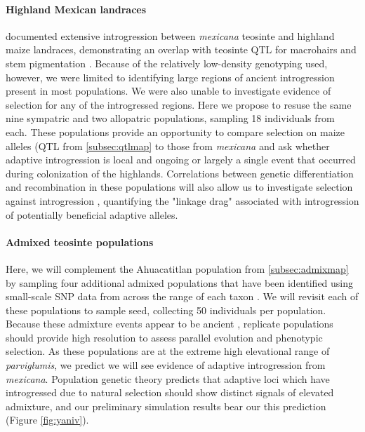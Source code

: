 \paragraph{Highland Mexican landraces}
\citet{Hufford2013} documented extensive introgression between \emph{mexicana} teosinte and highland maize landraces, demonstrating an overlap with teosinte QTL for macrohairs and stem pigmentation \citep{Lauter2004a}. Because of the relatively low-density genotyping used, however, we were limited to identifying large regions of ancient introgression present in most populations.  We were also unable to investigate evidence of selection for any of the introgressed regions.  Here we propose to resuse the same nine sympatric and two allopatric populations, sampling 18 individuals from each. These populations provide an opportunity to compare selection on maize alleles (QTL from \ref{subsec:qtlmap} to those from \emph{mexicana} and ask whether adaptive introgression is local and ongoing or largely a single event that occurred during colonization of the highlands. Correlations between genetic differentiation and recombination in these populations will also allow us to investigate selection against introgression \citep{Brandvain2013}, quantifying the "linkage drag" associated with introgression of potentially beneficial adaptive alleles.  

\paragraph{Admixed teosinte populations}
Here, we will complement the Ahuacatitlan population from \ref{subsec:admixmap} by sampling four additional admixed populations that have been identified using small-scale SNP data from across the range of each taxon \citep{vanheerwaarden2011a}.  We will revisit each of these populations to sample seed, collecting 50 individuals per population. Because these admixture events appear to be ancient \citep{Pyhajarvi2013}, replicate populations should provide high resolution to assess parallel evolution and phenotypic selection.  As these populations are at the extreme high elevational range of \emph{parviglumis}, we predict we will see evidence of adaptive introgression from \emph{mexicana}. Population genetic theory predicts that adaptive loci which have introgressed due to natural selection should show distinct signals of elevated admixture, and our preliminary simulation results bear our this prediction (Figure \ref{fig:yaniv}). 

